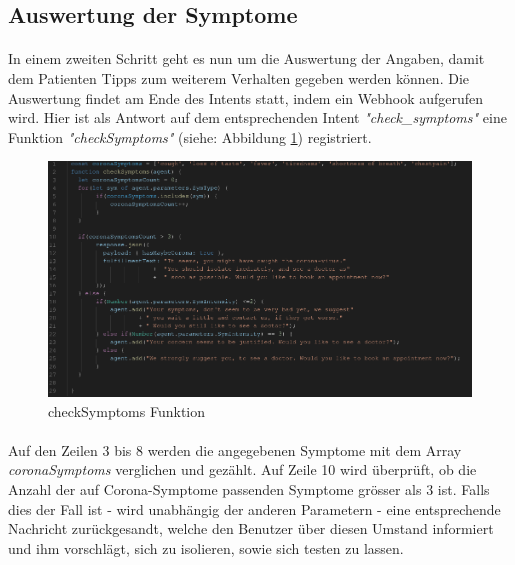 \documentclass[11pt,a4paper]{article}
\begin{document}
    \subsection{Auswertung der Symptome}
        \paragraph{}
            In einem zweiten Schritt geht es nun um die Auswertung der Angaben, damit dem Patienten Tipps zum weiterem Verhalten
            gegeben werden können. Die Auswertung findet am Ende des Intents statt, indem ein Webhook aufgerufen wird.
            Hier ist als Antwort auf dem entsprechenden Intent \emph{"check\_symptoms"} eine Funktion \emph{"checkSymptoms"}
            (siehe: Abbildung \ref{fig:checksymptomsfunction}) registriert.
	        \begin{figure}[h!]
    	        \begin{center}
        	        \includegraphics[width=\linewidth]{checkSymptoms.png}
            	    \caption{checkSymptoms Funktion}
	            	\label{fig:checksymptomsfunction}
	            \end{center}
    	    \end{figure}
    	    
		\paragraph{}
            Auf den Zeilen 3 bis 8 werden die angegebenen Symptome mit dem Array \emph{coronaSymptoms} verglichen und gezählt.
            Auf Zeile 10 wird überprüft, ob die Anzahl der auf Corona-Symptome passenden Symptome grösser als 3 ist. Falls dies
            der Fall ist - wird unabhängig der anderen Parametern - eine entsprechende Nachricht zurückgesandt, welche den Benutzer über
            diesen Umstand informiert und ihm vorschlägt, sich zu isolieren, sowie sich testen zu lassen.
\end{document}
